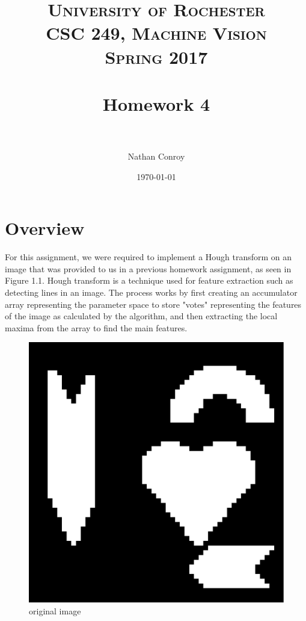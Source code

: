 \documentclass[paper=a4, fontsize=11pt]{scrartcl} %
\title{	
\normalfont \normalsize 
\textsc{University of Rochester\\CSC 249, Machine Vision\\Spring 2017} \\ [25pt] %
\horrule{0.5pt} \\[0.4cm] %
\huge Homework 4 \\ %
\horrule{2pt} \\[0.5cm] %
}
\author{Nathan Conroy} %
\date{\normalsize\today} %
\numberwithin{equation}{section} %
\numberwithin{figure}{section} %
\numberwithin{table}{section} %
\begin{document}
\maketitle %


\section{Overview}

For this assignment, we were required to implement a Hough transform on an image that was provided to us in a previous homework assignment, as seen in Figure 1.1. Hough transform is a technique used for feature extraction such as detecting lines in an image. The process works by first creating an accumulator array representing the parameter space to store "votes" representing the features of the image as calculated by the algorithm, and then extracting the local maxima from the array to find the main features.

\begin{figure}[H]
  \centering
  \begin{minipage}[b]{0.45\textwidth}
    \includegraphics[width=\textwidth]{original_image_binary.png}
    \caption{original image}
  \end{minipage}
\end{figure}
\end{document}
